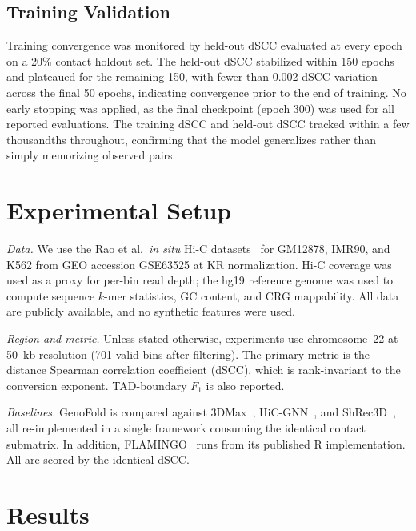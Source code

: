 \documentclass[conference]{IEEEtran}
\begin{document}
\subsection{Training Validation}
Training convergence was monitored by held-out dSCC evaluated at every
epoch on a 20\% contact holdout set. The held-out dSCC stabilized within
150 epochs and plateaued for the remaining 150, with fewer than 0.002
dSCC variation across the final 50 epochs, indicating convergence prior
to the end of training. No early stopping was applied, as the final
checkpoint (epoch 300) was used for all reported evaluations. The
training dSCC and held-out dSCC tracked within a few thousandths
throughout, confirming that the model generalizes rather than simply
memorizing observed pairs.

\section{Experimental Setup}

\textit{Data.} We use the Rao et al.\ \textit{in situ} Hi-C
datasets~\cite{rao2014} for GM12878, IMR90, and K562 from GEO accession
GSE63525 at KR normalization. Hi-C coverage was used as a proxy for
per-bin read depth; the hg19 reference genome was used to compute
sequence $k$-mer statistics, GC content, and CRG mappability. All data
are publicly available, and no synthetic features were used.

\textit{Region and metric.} Unless stated otherwise, experiments use
chromosome~22 at 50~kb resolution (701 valid bins after filtering). The
primary metric is the distance Spearman correlation coefficient (dSCC),
which is rank-invariant to the conversion exponent. TAD-boundary $F_1$
is also reported.

\textit{Baselines.} GenoFold is compared against
3DMax~\cite{oluwadare2018}, HiC-GNN~\cite{hicgnn2022}, and
ShRec3D~\cite{lesne2014}, all re-implemented in a single framework
consuming the identical contact submatrix. In addition,
FLAMINGO~\cite{flamingo2022} runs from its published R implementation.
All are scored by the identical dSCC.

\section{Results}
\label{sec:results}
\end{document}
